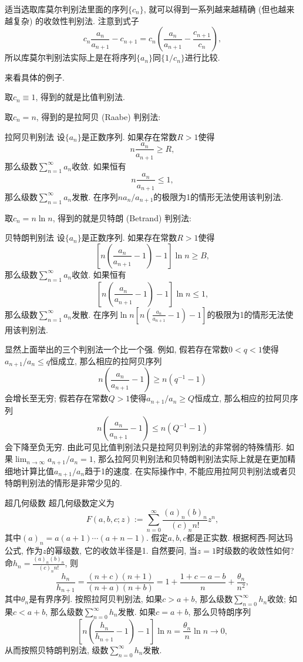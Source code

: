 适当选取库莫尔判别法里面的序列$\{c_n\}$, 就可以得到一系列越来越精确 (但也越来越复杂) 的收敛性判别法. 注意到式子
$$
c_n\frac{a_n}{a_{n+1}}-c_{n+1}=c_n\left(\frac{a_n}{a_{n+1}}-\frac{c_{n+1}}{c_n}\right),
$$
所以库莫尔判别法实际上是在将序列$\{a_n\}$同$\{1/c_n\}$进行比较.

来看具体的例子. 

取$c_n\equiv1$, 得到的就是比值判别法.

取$c_n=n$, 得到的是拉阿贝 (Raabe) 判别法:

\begin{theorem}{拉阿贝判别法}
设$\{a_n\}$是正数序列. 如果存在常数$R>1$使得
$$
n\frac{a_n}{a_{n+1}}\geq R,
$$
那么级数$\sum_{n=1}^\infty a_n$收敛. 如果恒有
$$
n\frac{a_n}{a_{n+1}}\leq 1,
$$
那么级数$\sum_{n=1}^\infty a_n$发散. 在序列$na_n/a_{n+1}$的极限为1的情形无法使用该判别法.
\end{theorem}

取$c_n=n\ln n$, 得到的就是贝特朗 (Betrand) 判别法:
\begin{theorem}{贝特朗判别法}
设$\{a_n\}$是正数序列. 如果存在常数$R>1$使得
$$
\left[n\left(\frac{a_n}{a_{n+1}}-1\right)-1\right]\ln n\geq B,
$$
那么级数$\sum_{n=1}^\infty a_n$收敛. 如果恒有
$$
\left[n\left(\frac{a_n}{a_{n+1}}-1\right)-1\right]\ln n\leq1,
$$
那么级数$\sum_{n=1}^\infty a_n$发散. 在序列$\ln n \left[n\left(\frac{a_n}{a_{n+1}}-1\right)-1\right]$的极限为1的情形无法使用该判别法.
\end{theorem}

显然上面举出的三个判别法一个比一个强. 例如, 假若存在常数$0<q<1$使得$a_{n+1}/a_{n}\leq q$恒成立, 那么相应的拉阿贝序列
$$
n\left(\frac{a_n}{a_{n+1}}-1\right)\geq n(q^{-1}-1)
$$
会增长至无穷; 假若存在常数$Q>1$使得$a_{n+1}/a_{n}\geq Q$恒成立, 那么相应的拉阿贝序列
$$
n\left(\frac{a_n}{a_{n+1}}-1\right)\leq n(Q^{-1}-1)
$$
会下降至负无穷. 由此可见比值判别法只是拉阿贝判别法的非常弱的特殊情形. 如果$\lim_{n\to\infty}a_{n+1}/a_{n}=1$, 那么拉阿贝判别法和贝特朗判别法实际上就是在更加精细地计算比值$a_{n+1}/a_{n}$趋于1的速度. 在实际操作中, 不能应用拉阿贝判别法或者贝特朗判别法的情形是非常少见的.

\begin{example}{超几何级数}
超几何级数定义为
$$
F(a,b,c;z):=\sum_{n=0}^\infty\frac{(a)_n(b)_n}{(c)_nn!}z^{n},
$$
其中$(a)_n=a(a+1)\dotsm(a+n-1)$. 假定$a,b,c$都是正实数. 根据柯西-阿达玛公式, 作为$z$的幂级数, 它的收敛半径是1. 自然要问, 当$z=1$时级数的收敛性如何? 
命$h_n=\frac{(a)_n(b)_n}{(c)_nn!}$, 则
$$
\frac{h_n}{h_{n+1}}=\frac{(n+c)(n+1)}{(n+a)(n+b)}
=1+\frac{1+c-a-b}{n}+\frac{\theta_n}{n^2},
$$
其中$\theta_n$是有界序列. 按照拉阿贝判别法, 如果$c>a+b$, 那么级数$\sum_{n=0}^\infty h_n$收敛; 如果$c<a+b$, 那么级数$\sum_{n=0}^\infty h_n$发散. 如果$c=a+b$, 那么贝特朗序列
$$
\left[n\left(\frac{h_n}{h_{n+1}}-1\right)-1\right]\ln n
=\frac{\theta_n}{n}\ln n\to0,
$$
从而按照贝特朗判别法, 级数$\sum_{n=0}^\infty h_n$发散.
\end{example}